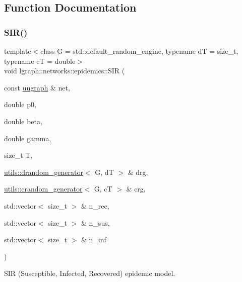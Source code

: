 \subsection{Function Documentation}
\mbox{\label{namespacelgraph_1_1networks_1_1epidemics_ab3c20f0604bb3c45e501755d10e7c7b1}} 
\subsubsection{\texorpdfstring{S\+I\+R()}{SIR()}\hspace{0.1cm}{\footnotesize\ttfamily [1/2]}}
{\footnotesize\ttfamily template$<$class G  = std\+::default\+\_\+random\+\_\+engine, typename dT  = size\+\_\+t, typename cT  = double$>$ \\
void lgraph\+::networks\+::epidemics\+::\+S\+IR (\begin{DoxyParamCaption}\item[{const \hyperlink{classlgraph_1_1uugraph}{uugraph} \&}]{net,  }\item[{double}]{p0,  }\item[{double}]{beta,  }\item[{double}]{gamma,  }\item[{size\+\_\+t}]{T,  }\item[{\hyperlink{classlgraph_1_1utils_1_1drandom__generator}{utils\+::drandom\+\_\+generator}$<$ G, dT $>$ \&}]{drg,  }\item[{\hyperlink{classlgraph_1_1utils_1_1crandom__generator}{utils\+::crandom\+\_\+generator}$<$ G, cT $>$ \&}]{crg,  }\item[{std\+::vector$<$ size\+\_\+t $>$ \&}]{n\+\_\+rec,  }\item[{std\+::vector$<$ size\+\_\+t $>$ \&}]{n\+\_\+sus,  }\item[{std\+::vector$<$ size\+\_\+t $>$ \&}]{n\+\_\+inf }\end{DoxyParamCaption})}



S\+IR (Susceptible, Infected, Recovered) epidemic model. 


